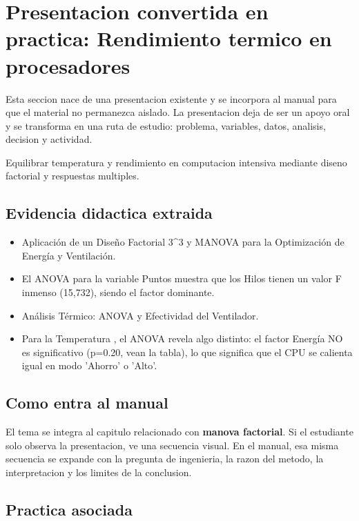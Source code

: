 \section{Presentacion convertida en practica: Rendimiento termico en procesadores}

Esta seccion nace de una presentacion existente y se incorpora al manual para que el material no permanezca aislado. La presentacion deja de ser un apoyo oral y se transforma en una ruta de estudio: problema, variables, datos, analisis, decision y actividad.

\begin{idea}
Equilibrar temperatura y rendimiento en computacion intensiva mediante diseno factorial y respuestas multiples.
\end{idea}

\subsection{Evidencia didactica extraida}

\begin{itemize}
\item Aplicación de un Diseño Factorial 3\textasciicircum{}3 y MANOVA para la Optimización de Energía y Ventilación.
\item El ANOVA para la variable Puntos muestra que los Hilos tienen un valor F inmenso (15,732), siendo el factor dominante.
\item Análisis Térmico: ANOVA y Efectividad del Ventilador.
\item Para la Temperatura , el ANOVA revela algo distinto: el factor Energía NO es significativo (p=0.20, vean la tabla), lo que significa que el CPU se calienta igual en modo 'Ahorro' o 'Alto'.
\end{itemize}

\subsection{Como entra al manual}

El tema se integra al capitulo relacionado con \textbf{manova factorial}. Si el estudiante solo observa la presentacion, ve una secuencia visual. En el manual, esa misma secuencia se expande con la pregunta de ingenieria, la razon del metodo, la interpretacion y los limites de la conclusion.

\subsection{Practica asociada}

